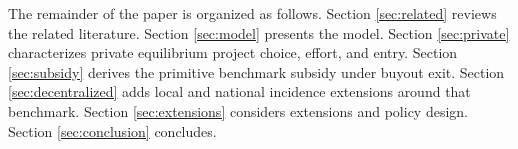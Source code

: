 The remainder of the paper is organized as follows. Section \ref{sec:related} reviews the related literature. Section \ref{sec:model} presents the model. Section \ref{sec:private} characterizes private equilibrium project choice, effort, and entry. Section \ref{sec:subsidy} derives the primitive benchmark subsidy under buyout exit. Section \ref{sec:decentralized} adds local and national incidence extensions around that benchmark. Section \ref{sec:extensions} considers extensions and policy design. Section \ref{sec:conclusion} concludes.
